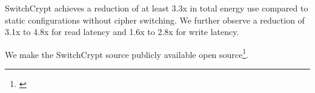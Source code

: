 SwitchCrypt achieves a reduction of at least 3.3x in total energy use compared
to static configurations without cipher switching. We further observe a
reduction of 3.1x to 4.8x for read latency and 1.6x to 2.8x for write latency.

We make the SwitchCrypt source publicly available open
source\footnote{\label{note1}\SystemURI}.
